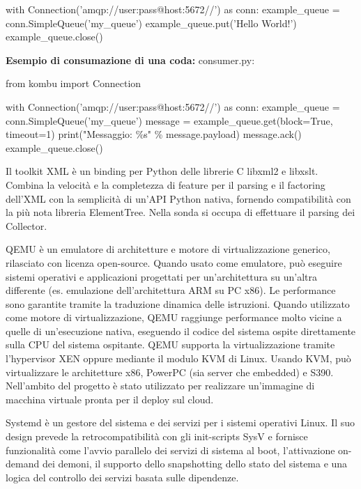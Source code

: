 \documentclass[../main.tex]{subfiles}
\begin{document}
\begin{description}[nolistsep]
\begin{itemize}[nolistsep]
\begin{python}
with Connection('amqp://user:pass@host:5672//') as conn:
    example_queue = conn.SimpleQueue('my_queue')
    example_queue.put('Hello World!')
    example_queue.close()
\end{python}


\textbf{Esempio di consumazione di una coda:}
consumer.py:
\begin{python}
from kombu import Connection

with Connection('amqp://user:pass@host:5672//') as conn:
    example_queue = conn.SimpleQueue('my_queue')
    message = example_queue.get(block=True, timeout=1)
    print("Messaggio: \%s" \% message.payload)
    message.ack()
    example_queue.close()
\end{python}
\end{itemize}
\item[lxml Toolkit]Il toolkit XML è un binding per Python delle librerie C libxml2 e libxslt. Combina la velocità e la completezza di feature per il parsing e il factoring dell'XML con la semplicità di un'API Python nativa, fornendo compatibilità con la più nota libreria ElementTree.
\newline
Nella sonda si occupa di effettuare il parsing dei Collector.
\item[QEMU]QEMU è un emulatore di architetture e motore di virtualizzazione generico, rilasciato con licenza open-source. Quando usato come emulatore, può eseguire sistemi operativi e applicazioni progettati per un'architettura su un'altra differente (es. emulazione dell'architettura ARM su PC x86). Le performance sono garantite tramite la traduzione dinamica delle istruzioni.
Quando utilizzato come motore di virtualizzazione, QEMU raggiunge performance molto vicine a quelle di un'esecuzione nativa, eseguendo il codice del sistema ospite direttamente sulla CPU del sistema ospitante. QEMU supporta la virtualizzazione tramite l'hypervisor XEN oppure mediante il modulo KVM di Linux. Usando KVM, può virtualizzare le architetture x86, PowerPC (sia server che embedded) e S390.
\newline
Nell'ambito del progetto è stato utilizzato per realizzare un'immagine di macchina virtuale pronta per il deploy sul cloud.
\item[Systemd]
Systemd è un gestore del sistema e dei servizi per i sistemi operativi Linux. Il suo design prevede la retrocompatibilità con gli init-scripts SysV e fornisce funzionalità come l'avvio parallelo dei servizi di sistema al boot, l'attivazione on-demand dei demoni, il supporto dello snapshotting dello stato del sistema e una logica del controllo dei servizi basata sulle dipendenze.

\end{description}
\end{document}
